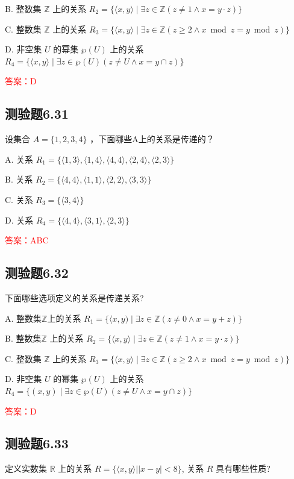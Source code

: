 \documentclass[UTF8, heading=true]{ctexart}
\begin{document}
B. 整数集 $\mathbb{Z}$ 上的关系 $R_2=\{\langle x, y\rangle \mid \exists z \in \mathbb{Z}(z \neq 1 \wedge x=y \cdot z)\}$

C. 整数集 $\mathbb{Z}$ 上的关系 $R_3=\{\langle x, y\rangle \mid \exists z \in \mathbb{Z}(z \geq 2 \wedge x \bmod z=y \bmod z)\}$

D. 非空集 $U$ 的幂集 $\wp(U)$ 上的关系 $R_4=\{\langle x, y\rangle \mid \exists z \in \wp(U)(z \neq U \wedge x=y \cap z)\}$

\textcolor{red}{答案：D}

\subsection{测验题6.31}

设集合 $A=\{1,2,3,4\}$ ，下面哪些A上的关系是传递的？

A. 关系 $R_1=\{\langle 1,3\rangle,\langle 1,4\rangle,\langle 4,4\rangle,\langle 2,4\rangle,\langle 2,3\rangle\}$

B. 关系 $R_2=\{\langle 4,4\rangle,\langle 1,1\rangle,\langle 2,2\rangle,\langle 3,3\rangle\}$

C. 关系 $R_3=\{\langle 3,4\rangle\}$

D. 关系 $R_4=\{\langle 4,4\rangle,\langle 3,1\rangle,\langle 2,3\rangle\}$


\textcolor{red}{答案：ABC}

\subsection{测验题6.32}

下面哪些选项定义的关系是传递关系?

A. 整数集$\mathbb{Z}$上的关系 $R_1=\{\langle x, y) \mid \exists z \in \mathbb{Z}(z \neq 0 \wedge x=y+z)\}$

B. 整数集$\mathbb{Z}$ 上的关系 $R_2=\{\langle x, y\rangle \mid \exists z \in \mathbb{Z}(z \neq 1 \wedge x=y \cdot z)\}$

C. 整数集 $\mathbb{Z}$ 上的关系 $R_3=\{\langle x, y\rangle \mid \exists z \in \mathbb{Z}(z \geq 2 \wedge x \bmod z=y \bmod z)\}$

D. 非空集 $U$ 的幂集 $\wp(U)$ 上的关系 $R_4=\{(x, y) \mid \exists z \in \wp(U)(z \neq U \wedge x=y \cap z)\}$

\textcolor{red}{答案：D}


\subsection{测验题6.33}
定义实数集 $\mathbb{R}$ 上的关系 $R=\{\langle x, y\rangle| | x-y \mid<8\}$, 关系 $R$ 具有哪些性质?
\end{document}
